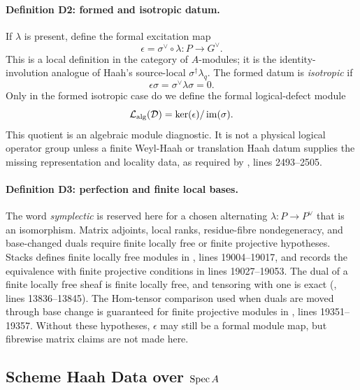 \paragraph{Definition D2: formed and isotropic datum.}
If \(\lambda\) is present, define the formal excitation map
\[
  \epsilon=\sigma^\vee\circ\lambda:P\longrightarrow G^\vee.
\]
This is a local definition in the category of \(A\)-modules; it is the
identity-involution analogue of Haah's source-local
\(\sigma^\dagger\lambda_q\).  The formed datum is \emph{isotropic} if
\[
  \epsilon\sigma=\sigma^\vee\lambda\sigma=0.
\]
Only in the formed isotropic case do we define the formal logical-defect module
\[
  \mathcal L_{\rm alg}(\mathcal D)
  =
  \ker(\epsilon)/\operatorname{im}(\sigma).
\]
This quotient is an algebraic module diagnostic.  It is not a physical logical
operator group unless a finite Weyl-Haah or translation Haah datum supplies the
missing representation and locality data, as required by
, lines 2493--2505.

\paragraph{Definition D3: perfection and finite local bases.}
The word \emph{symplectic} is reserved here for a chosen alternating
\(\lambda:P\to P^\vee\) that is an isomorphism.  Matrix adjoints, local ranks,
residue-fibre nondegeneracy, and base-changed duals require finite locally free
or finite projective hypotheses.  Stacks defines finite locally free modules in
, lines
19004--19017, and records the equivalence with finite projective conditions in
lines 19027--19053.  The dual of a finite locally free sheaf is finite locally
free, and tensoring with one is exact
(, lines
13836--13845).  The Hom-tensor comparison used when duals are moved through
base change is guaranteed for finite projective modules in
, lines
19351--19357.  Without these hypotheses, \(\epsilon\) may still be a formal
module map, but fibrewise matrix claims are not made here.

\subsection{Scheme Haah Data over \texorpdfstring{\(\operatorname{Spec} A\)}{Spec A}}

